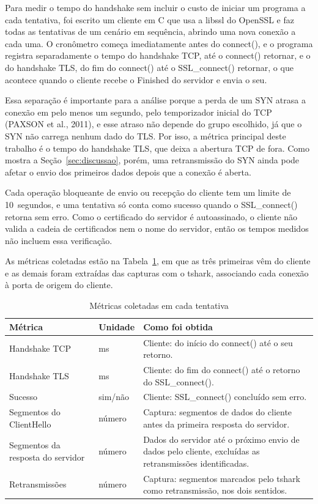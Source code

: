 \documentclass[12pt,a4paper]{article}
\newcommand{\fonte}[1]{\par\vspace{4pt}{\small Fonte: #1}}
\begin{document}
Para medir o tempo do handshake sem incluir o custo de iniciar um programa
a cada tentativa, foi escrito um cliente em C que usa a libssl do OpenSSL e
faz todas as tentativas de um cenário em sequência, abrindo uma nova
conexão a cada uma. O cronômetro começa imediatamente antes do
connect(), e o programa registra separadamente o tempo do handshake TCP, até o
connect() retornar, e o do handshake TLS, do fim do connect() até o SSL\_connect() retornar, o que acontece
quando o cliente recebe o Finished do servidor e envia o seu.

Essa separação é importante para a análise porque a perda de um SYN atrasa a
conexão em pelo menos um segundo, pelo temporizador inicial do TCP
(PAXSON et al., 2011), e esse atraso não depende do grupo escolhido, já que
o SYN não carrega nenhum dado do TLS. Por isso, a métrica principal deste
trabalho é o tempo do handshake TLS, que deixa a abertura TCP de fora. Como
mostra a Seção~\ref{sec:discussao}, porém, uma retransmissão do SYN ainda
pode afetar o envio dos primeiros dados depois que a conexão é aberta.

Cada operação bloqueante de envio ou recepção do cliente tem um limite de
10~segundos, e uma tentativa só conta como sucesso quando o SSL\_connect()
retorna sem erro. Como o certificado do servidor é autoassinado, o cliente
não valida a cadeia de certificados nem o nome do servidor, então os tempos
medidos não incluem essa verificação.

As métricas coletadas estão na Tabela~\ref{tab:metricas-experimento}, em
que as três primeiras vêm do cliente e as demais foram extraídas das capturas com
o tshark, associando cada conexão à porta de origem do cliente.

\begin{table}[H]
\centering
\caption{Métricas coletadas em cada tentativa}
\label{tab:metricas-experimento}
\small
\begin{tabular}{p{4.4cm}p{1.4cm}p{7.2cm}}
\toprule
Métrica & Unidade & Como foi obtida \\
\midrule
Handshake TCP & ms & Cliente: do início do connect() até o seu retorno. \\
Handshake TLS & ms & Cliente: do fim do connect() até o retorno do SSL\_connect(). \\
Sucesso & sim/não & Cliente: SSL\_connect() concluído sem erro. \\
Segmentos do ClientHello & número & Captura: segmentos de dados do cliente antes da primeira resposta do servidor. \\
Segmentos da resposta do servidor & número & Dados do servidor até o próximo envio de dados pelo cliente, excluídas as retransmissões identificadas. \\
Retransmissões & número & Captura: segmentos marcados pelo tshark como retransmissão, nos dois sentidos. \\
\bottomrule
\end{tabular}
\fonte{Elaborado pelos autores.}
\end{table}
\end{document}
